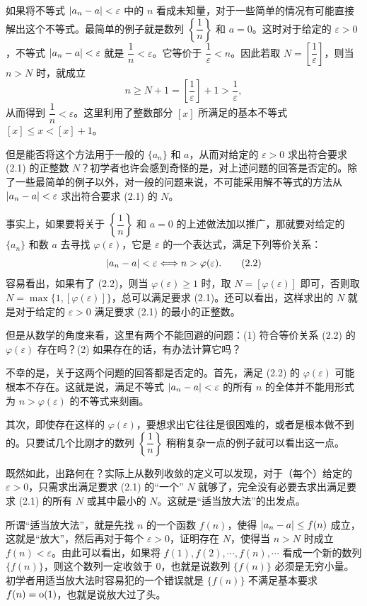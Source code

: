 如果将不等式 $\lvert a_n-a\rvert<\varepsilon$ 中的 $n$ 看成未知量，对于一些简单的情况有可能直接解出这个不等式。最简单的例子就是数列 $\left\{\dfrac1n\right\}$ 和 $a=0$。这时对于给定的 $\varepsilon>0$，不等式 $\lvert a_n-a\rvert<\varepsilon$ 就是 $\dfrac1n<\varepsilon$。它等价于 $\dfrac1\varepsilon<n$。因此若取 $N=\left[\dfrac1\varepsilon\right]$，则当 $n>N$ 时，就成立
\[
  n\ge N+1=\left[\frac1\varepsilon\right]+1>\frac1\varepsilon,
\]
从而得到 $\dfrac1n<\varepsilon$。这里利用了整数部分 $[x]$ 所满足的基本不等式 $[x]\le x<[x]+1$。

但是能否将这个方法用于一般的 $\{a_n\}$ 和 $a$，从而对给定的 $\varepsilon>0$ 求出符合要求 (2.1) 的正整数 $N$？初学者也许会感到奇怪的是，对上述问题的回答是否定的。除了一些最简单的例子以外，对一般的问题来说，不可能采用解不等式的方法从 $\lvert a_n-a\rvert<\varepsilon$ 求出符合要求 (2.1) 的 $N$。

事实上，如果要将关于 $\left\{\dfrac1n\right\}$ 和 $a=0$ 的上述做法加以推广，那就要对给定的 $\{a_n\}$ 和数 $a$ 去寻找 $\varphi(\varepsilon)$，它是 $\varepsilon$ 的一个表达式，满足下列等价关系：
\begin{equation}
  \lvert a_n-a\rvert<\varepsilon\Longleftrightarrow n>\varphi(\varepsilon).
  \tag{2.2}
  \label{eq:2.2}
\end{equation}
容易看出，如果有了 (2.2)，则当 $\varphi(\varepsilon)\ge1$ 时，取 $N=[\varphi(\varepsilon)]$ 即可，否则取 $N=\max\{1,[\varphi(\varepsilon)]\}$，总可以满足要求 (2.1)。还可以看出，这样求出的 $N$ 就是对于给定的 $\varepsilon>0$ 满足要求 (2.1) 的最小的正整数。

但是从数学的角度来看，这里有两个不能回避的问题：(1) 符合等价关系 (2.2) 的 $\varphi(\varepsilon)$ 存在吗？(2) 如果存在的话，有办法计算它吗？

不幸的是，关于这两个问题的回答都是否定的。首先，满足 (2.2) 的 $\varphi(\varepsilon)$ 可能根本不存在。这就是说，满足不等式 $\lvert a_n-a\rvert<\varepsilon$ 的所有 $n$ 的全体并不能用形式为 $n>\varphi(\varepsilon)$ 的不等式来刻画。

其次，即使存在这样的 $\varphi(\varepsilon)$，要想求出它往往是很困难的，或者是根本做不到的。只要试几个比刚才的数列 $\left\{\dfrac1n\right\}$ 稍稍复杂一点的例子就可以看出这一点。

既然如此，出路何在？实际上从数列收敛的定义可以发现，对于（每个）给定的 $\varepsilon>0$，只需求出满足要求 (2.1) 的“一个” $N$ 就够了，完全没有必要去求出满足要求 (2.1) 的所有 $N$ 或其中最小的 $N$。这就是“适当放大法”的出发点。

所谓“适当放大法”，就是先找 $n$ 的一个函数 $f(n)$，使得 $\lvert a_n-a\rvert\le f(n)$ 成立，这就是“放大”，然后再对于每个 $\varepsilon>0$，证明存在 $N$，使得当 $n>N$ 时成立 $f(n)<\varepsilon$。由此可以看出，如果将 $f(1),f(2),\cdots,f(n),\cdots$ 看成一个新的数列 $\{f(n)\}$，则这个数列一定收敛于 $0$，也就是说数列 $\{f(n)\}$ 必须是无穷小量。初学者用适当放大法时容易犯的一个错误就是 $\{f(n)\}$ 不满足基本要求 $f(n)=\mathrm{o}(1)$，也就是说放大过了头。

